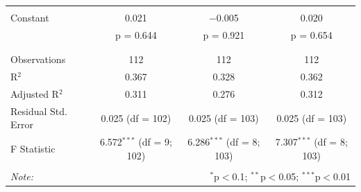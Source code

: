 \begin{table}[!htbp]
\begin{tabular}{@{\extracolsep{5pt}}lccc}
  & & & \\ 
 Constant & 0.021 & $-$0.005 & 0.020 \\ 
  & p = 0.644 & p = 0.921 & p = 0.654 \\ 
  & & & \\ 
\hline \\[-1.8ex] 
Observations & 112 & 112 & 112 \\ 
R$^{2}$ & 0.367 & 0.328 & 0.362 \\ 
Adjusted R$^{2}$ & 0.311 & 0.276 & 0.312 \\ 
Residual Std. Error & 0.025 (df = 102) & 0.025 (df = 103) & 0.025 (df = 103) \\ 
F Statistic & 6.572$^{***}$ (df = 9; 102) & 6.286$^{***}$ (df = 8; 103) & 7.307$^{***}$ (df = 8; 103) \\ 
\hline 
\hline \\[-1.8ex] 
\textit{Note:}  & \multicolumn{3}{r}{$^{*}$p$<$0.1; $^{**}$p$<$0.05; $^{***}$p$<$0.01} \\ 
\end{tabular} 
\end{table}



